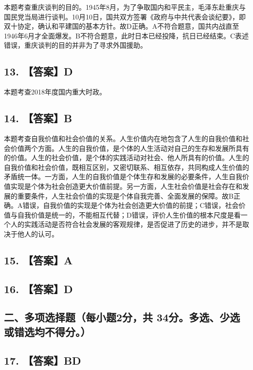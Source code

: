 \documentclass[UTF8,11pt]{ctexart}
\begin{document}
本题考查重庆谈判的目的。1945年8月，为了争取国内和平民主，毛泽东赴重庆与国民党当局进行谈判。10月10日，国共双方签署《政府与中共代表会谈纪要》，即双十协定，确认和平建国的基本方针。故D正确。A不符合题意，国共内战直至 1946年6月才全面爆发。B不符合题意，此时日本已经投降，抗日已经结束。C表述错误，重庆谈判的目的并非为了寻求外国援助。


\subsection*{13. 【答案】D}

本题考查2018年度国内重大时政。


\subsection*{14. 【答案】B}

本题考查自我价值和社会价值的关系。人生价值内在地包含了人生的自我价值和社会价值两个方面。人生的自我价值，是个体的人生活动对自己的生存和发展所具有的价值。人生的社会价值，是个体的实践活动对社会、他人所具有的价值。人生的自我价值和社会价值，既相互区别，又密切联系、相互依存，共同构成人生价值的矛盾统一体。一方面，人生的自我价值是个体生存和发展的必要条件，人生自我价值实现是个体为社会创造更大价值前提。另一方面，人生社会价值是社会存在和发展的重要条件，人生社会价值的实现是个体自我完善、全面发展的保障。故B正确。A错误，自我价值的实现是个体为社会创造更大价值的前提；C错误，社会价值与自我价值是统一的，不能相互代替；D错误，评价人生价值的根本尺度是看一个人的实践活动是否符合社会发展的客观规律，是否促进了历史的进步，并不是取决于他人的认可。


\subsection*{15. 【答案】A}

\subsection*{16. 【答案】D}

\subsection*{二、多项选择题（每小题2分，共 34分。多选、少选或错选均不得分。）}

\subsection*{17. 【答案】BD}
\end{document}
